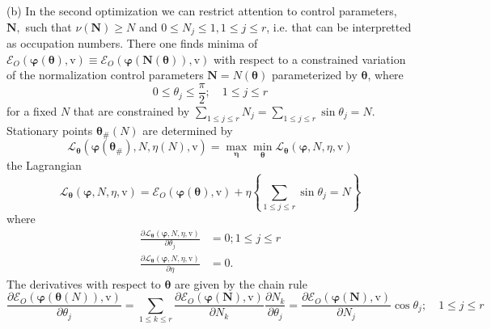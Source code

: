 \documentclass[aps,preprint]{revtex4}%
\begin{document}
(b) In the second optimization we can restrict attention to control
parameters, $\boldsymbol{N},$ such that $\nu\left(  \boldsymbol{N}\right)
\geq N$ and $0\leq N_{j}\leq1,1\leq j\leq r$, i.e. that can be interpretted as
occupation numbers. There one finds minima of $\mathcal{E}_{O}\left(
\boldsymbol{\varphi\left(  \boldsymbol{\theta}\right)  ,}\mathrm{v}\right)
\equiv\mathcal{E}_{O}\left(  \boldsymbol{\varphi\left(  N\left(
\boldsymbol{\theta}\right)  \right)  ,}\mathrm{v}\right)  $ with respect to a
constrained variation of the normalization control parameters $\boldsymbol{N}%
=N\left(  \boldsymbol{\theta}\right)  $ parameterized by $\boldsymbol{\theta}%
$, where
\[
0\leq\theta_{j}\leq\frac{\pi}{2};\quad1\leq j\leq r
\]
for a fixed $N$ that are constrained by $\sum_{1\leq j\leq r}N_{j}=\sum_{1\leq
j\leq r}\sin\theta_{j}=N$. Stationary points $\boldsymbol{\theta}_{\#}\left(
N\right)  $ are determined by
\begin{equation}
\mathcal{L}_{\boldsymbol{\theta}}\left(  \boldsymbol{\varphi\left(
\boldsymbol{\theta}_{\#}\right)  ,}N\boldsymbol{,}\eta\left(  N\right)
\boldsymbol{,}\mathrm{v}\right)  =\max_{\boldsymbol{\eta}}\min
_{\boldsymbol{\theta}}\mathcal{L}_{\boldsymbol{\theta}}\left(
\boldsymbol{\varphi,}N\boldsymbol{,}\eta\boldsymbol{,}\mathrm{v}\right)
\end{equation}
the Lagrangian
\begin{equation}
\mathcal{L}_{\boldsymbol{\theta}}\left(  \boldsymbol{\varphi,}N\boldsymbol{,}%
\eta\boldsymbol{,}\mathrm{v}\right)  =\mathcal{E}_{O}\left(
\boldsymbol{\varphi}\left(  \boldsymbol{\theta}\right)  \boldsymbol{,}%
\mathrm{v}\right)  +\eta\left\{  \sum_{1\leq j\leq r}\sin\theta_{j}=N\right\}
\end{equation}
where
\begin{align}
\frac{\partial\mathcal{L}_{\boldsymbol{\theta}}\left(  \boldsymbol{\varphi
,}N\boldsymbol{,}\eta\boldsymbol{,}\mathrm{v}\right)  }{\partial\theta_{j}}
&  =0;1\leq j\leq r\\
\frac{\partial\mathcal{L}_{\boldsymbol{\theta}}\left(  \boldsymbol{\varphi
,}N\boldsymbol{,}\eta\boldsymbol{,}\mathrm{v}\right)  }{\partial\eta}  &
=0.\nonumber
\end{align}
The derivatives with respect to $\boldsymbol{\theta}$ are given by the chain
rule
\begin{equation}
\frac{\partial\mathcal{E}_{O}\left(  \boldsymbol{\varphi}\left(
\boldsymbol{\theta}\left(  N\right)  \right)  \boldsymbol{,}\mathrm{v}\right)
}{\partial\theta_{j}}=\sum\limits_{1\leq k\leq r}\frac{\partial\mathcal{E}%
_{O}\left(  \boldsymbol{\varphi}\left(  \boldsymbol{N}\right)  \boldsymbol{,}%
\mathrm{v}\right)  }{\partial N_{k}}\frac{\partial N_{k}}{\partial\theta_{j}%
}=\frac{\partial\mathcal{E}_{O}\left(  \boldsymbol{\varphi}\left(
\boldsymbol{N}\right)  \boldsymbol{,}\mathrm{v}\right)  }{\partial N_{j}}%
\cos\theta_{j};\quad1\leq j\leq r \label{ThetaDer}%
\end{equation}
\end{document}
